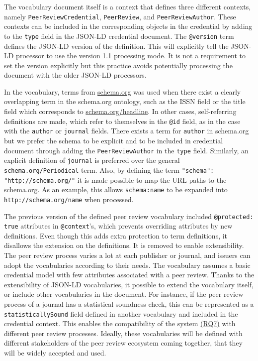 

The vocabulary document itself is a context that defines three different contexts, namely \lstinline{PeerReviewCredential}, \lstinline{PeerReview}, and \lstinline{PeerReviewAuthor}. These contexts can be included in the corresponding objects in the credential by adding to the \lstinline{type} field in the \acrshort{JSON-LD} credential document. The \lstinline{@version} term defines the \acrshort{JSON-LD} version of the definition. This will explicitly tell the \acrshort{JSON-LD} processor to use the version 1.1 processing mode. It is not a requirement to set the version explicitly but this practice avoids potentially processing the document with the older \acrshort{JSON-LD} processors. 


In the vocabulary, terms from \url{schema.org} was used when there exist a clearly overlapping term in the schema.org ontology, such as the \acrshort{ISSN} field or the title field which corresponds to \url{schema.org/headline}. In other cases, self-referring definitions are made, which refer to themselves in the \lstinline{@id} field, as in the case with the \lstinline{author} or \lstinline{journal} fields. There exists a term for \lstinline{author} in schema.org but we prefer the schema to be explicit and to be included in credential document through adding the \lstinline{PeerReviewAuthor} in the \lstinline{type} field. Similarly, an explicit definition of \lstinline{journal} is preferred over the general \lstinline{schema.org/Periodical} term. Also, by defining the term \lstinline{"schema": "http://schema.org/"} it is made possible to map the \acrshort{URL} paths to the schema.org. As an example, this allows \lstinline{schema:name} to be expanded into \lstinline{http://schema.org/name} when processed. 

The previous version of the defined peer review vocabulary included \lstinline{@protected: true} attributes in \lstinline{@context}'s, which prevents overriding attributes by new definitions. Even though this adds extra protection to term definitions, it disallows the extension on the definitions. It is removed to enable extensibility. The peer review process varies a lot at each publisher or journal, and issuers can adopt the vocabularies according to their needs. The vocabulary assumes a basic credential model with few attributes associated with a peer review. Thanks to the extensibility of \acrshort{JSON-LD} vocabularies, it possible to extend the vocabulary itself, or include other vocabularies in the document. For instance, if the peer review process of a journal has a statistical soundness check, this can be represented as a \lstinline{statisticallySound} field defined in another vocabulary and included in the credential context. This enables the compatibility of the system \hyperref[rq:compatible]{(RQ7)} with different peer review processes.  Ideally, these vocabularies will be defined with different stakeholders of the peer review ecosystem coming together, that they will be widely accepted and used.


